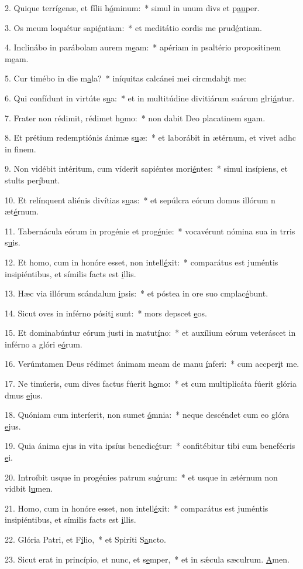 2. Quique terrígenæ, et fílii h\uline{ó}minum:~* simul in unum divs et p\uline{au}per.\par 
3. Os meum loquétur sapi\uline{é}ntiam:~* et meditátio cordis me prud\uline{é}ntiam.\par 
4. Inclinábo in parábolam aurem m\uline{e}am:~* apériam in psaltério propositinem m\uline{e}am.\par 
5. Cur timébo in die m\uline{a}la?~* iníquitas calcánei mei circmdab\uline{i}t me:\par 
6. Qui confídunt in virtúte s\uline{u}a:~* et in multitúdine divitiárum suárum glri\uline{á}ntur.\par 
7. Frater non rédimit, rédimet h\uline{o}mo:~* non dabit Deo placatinem s\uline{u}am.\par 
8. Et prétium redemptiónis ánimæ s\uline{u}æ:~* et laborábit in ætérnum, et vivet adhc in f\uline{i}nem.\par 
9. Non vidébit intéritum, cum víderit sapiéntes mori\uline{é}ntes:~* simul insípiens, et stults per\uline{í}bunt.\par 
10. Et relínquent aliénis divítias s\uline{u}as:~* et sepúlcra eórum domus illórum n æt\uline{é}rnum.\par 
11. Tabernácula eórum in progénie et prog\uline{é}nie:~* vocavérunt nómina sua in trris s\uline{u}is.\par 
12. Et homo, cum in honóre esset, non intell\uline{é}xit:~* comparátus est juméntis insipiéntibus, et símilis facts est \uline{i}llis.\par 
13. Hæc via illórum scándalum \uline{i}psis:~* et póstea in ore suo cmplac\uline{é}bunt.\par 
14. Sicut oves in inférno pósit\uline{i} sunt:~* mors depscet \uline{e}os.\par 
15. Et dominabúntur eórum justi in matut\uline{í}no:~* et auxílium eórum veteráscet in inférno a glóri e\uline{ó}rum.\par 
16. Verúmtamen Deus rédimet ánimam meam de manu \uline{í}nferi:~* cum accper\uline{i}t me.\par 
17. Ne timúeris, cum dives factus fúerit h\uline{o}mo:~* et cum multiplicáta fúerit glória dmus \uline{e}jus.\par 
18. Quóniam cum interíerit, non sumet \uline{ó}mnia:~* neque descéndet cum eo glóra \uline{e}jus.\par 
19. Quia ánima ejus in vita ipsíus benedic\uline{é}tur:~* confitébitur tibi cum benefécris \uline{e}i.\par 
20. Introíbit usque in progénies patrum su\uline{ó}rum:~* et usque in ætérnum non vidbit l\uline{u}men.\par 
21. Homo, cum in honóre esset, non intell\uline{é}xit:~* comparátus est juméntis insipiéntibus, et símilis facts est \uline{i}llis.\par 
22. Glória Patri, et F\uline{í}lio,~* et Spiríti S\uline{a}ncto.\par 
23. Sicut erat in princípio, et nunc, et s\uline{e}mper,~* et in sǽcula sæculrum. \uline{A}men.\par 
